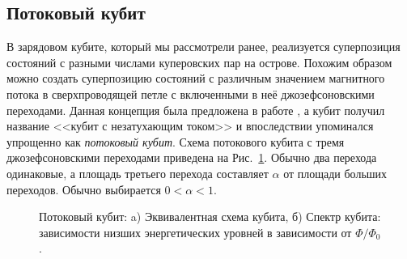 \subsection{Потоковый кубит}
\label{flux_q}
В зарядовом кубите, который мы рассмотрели ранее, реализуется суперпозиция состояний с разными числами куперовских пар на острове. Похожим образом можно создать суперпозицию состояний с различным значением магнитного потока в сверхпроводящей петле с включенными в неё джозефсоновскими переходами. Данная концепция была предложена в работе \cite{mooij1999josephson}, а кубит получил название <<кубит с незатухающим током>> и впоследствии упоминался упрощенно как \textit{потоковый кубит}. Схема потокового кубита с тремя джозефсоновскими переходами приведена на Рис.~\ref{img: flux_q}. Обычно два перехода одинаковые, а площадь третьего перехода составляет $\alpha$ от площади больших переходов. Обычно выбирается $0\!<\!\alpha\!<\!1$. 
\begin{figure}[b]
	{ \raggedleft
		\hfill
		\def\svgwidth{3in}
		\fontsize{19pt}{19pt}\selectfont
		\hfill
		
		\hfill
	}
	\caption[Схема потокового кубита и его потенциальная энергия.]{Потоковый кубит: a) Эквивалентная схема кубита, б) Спектр кубита: зависимости низших энергетических уровней в зависимости от $\Phi/\Phi_0$.}
	\label{img: flux_q}
	
\end{figure}

